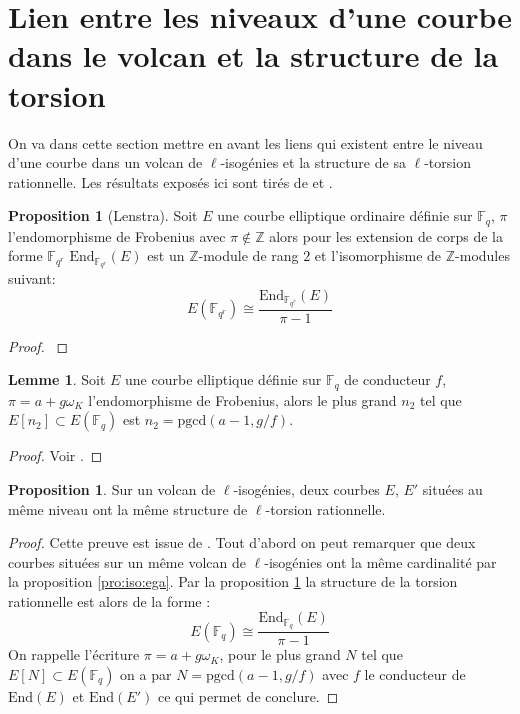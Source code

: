 \documentclass[10pt,a4paper]{book}
\theoremstyle{plain}
\theoremstyle{definition}
\newtheorem{lem}[thm]{Lemme}
\theoremstyle{definition}
\theoremstyle{definition}
\newtheorem{prop}[thm]{Proposition}
\theoremstyle{definition}
\theoremstyle{remark}
\theoremstyle{remark}
\theoremstyle{definition}
\begin{document}
\section{Lien entre les niveaux d'une courbe dans le volcan et la structure de la torsion}
\label{sec:lie:niv}
On va dans cette section mettre en avant les liens qui existent entre le niveau
d'une courbe dans un volcan de $\ell$-isogénies et la structure de sa 
$\ell$-torsion rationnelle. Les résultats exposés ici sont tirés de 
\cite{MiretMSTV08} et \cite{Ionica-Joux10}.

\begin{prop}[Lenstra]
\label{pro:len:str}
Soit $E$ une courbe elliptique ordinaire définie sur $\mathbb{F}_q$, $\pi$ 
l'endomorphisme de Frobenius avec $\pi \not \in \mathbb{Z}$ alors pour les 
extension de corps de la forme $\mathbb{F}_{q^r}$ $\mathrm{End}_{
\mathbb{F}_{q^r}}(E)$ est un $\mathbb{Z}$-module de rang $2$ et l'isomorphisme 
de $\mathbb{Z}$-modules suivant:
\[
E(\mathbb{F}_{q^r}) \cong \frac{\mathrm{End}_{\mathbb{F}_{q^r}}(E)}{\pi-1}
\] 
\end{prop}

\begin{proof}
\cite[Theorem 1]{Lenstra1996}
\end{proof}

\begin{lem}
\label{lem:ruc:rat}
Soit $E$ une courbe elliptique définie sur $\mathbb{F}_q$ de conducteur $f$, 
$\pi=a+g \omega_K$ l'endomorphisme de Frobenius, alors le plus grand $n_2$ tel 
que $E[n_2] \subset E(\mathbb{F}_q)$ est $n_2=\mathrm{pgcd}(a-1,g/f)$.
\end{lem}

\begin{proof}
Voir  \cite[Lemma 1]{Ruck1987}.
\end{proof}

\begin{prop}
Sur un volcan de $\ell$-isogénies, deux courbes $E$, $E'$ situées au même niveau ont la même structure de $\ell$-torsion rationnelle.
\end{prop}

\begin{proof}
Cette preuve est issue de \cite{Ionica2010}.
Tout d'abord on peut remarquer que deux courbes situées sur un même volcan de $\ell$-isogénies ont la même cardinalité par la proposition \ref{pro:iso:ega}. Par la proposition \ref{pro:len:str} la structure de la torsion rationnelle est alors de la forme :
\[
E(\mathbb{F}_{q}) \cong \frac{\mathrm{End}_{\mathbb{F}_{q}}(E)}{\pi-1}
\] 
On rappelle l'écriture $\pi=a + g \omega_K$, pour le plus grand $N$ tel que $E[N] \subset E(\mathbb{F}_q)$ on a par \cite[Lemma 1]{Ruck1987} $N=\mathrm{pgcd}(a-1,g/f)$ avec $f$ le conducteur de $\mathrm{End}(E)$ et $\mathrm{End}(E')$ ce qui permet de conclure.
\end{proof}
\end{document}

